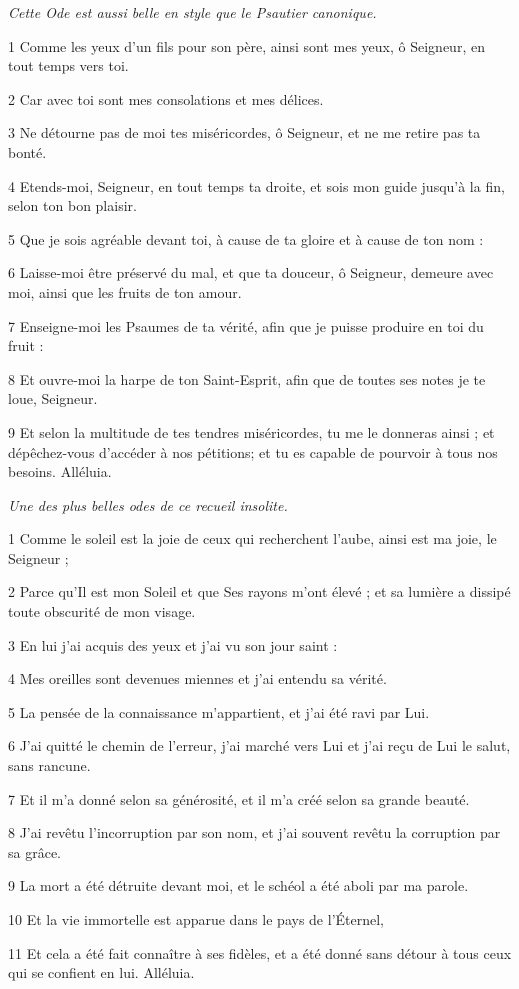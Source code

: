 
\par \textit{Cette Ode est aussi belle en style que le Psautier canonique.}

\par 1 Comme les yeux d'un fils pour son père, ainsi sont mes yeux, ô Seigneur, en tout temps vers toi.
\par 2 Car avec toi sont mes consolations et mes délices.
\par 3 Ne détourne pas de moi tes miséricordes, ô Seigneur, et ne me retire pas ta bonté.
\par 4 Etends-moi, Seigneur, en tout temps ta droite, et sois mon guide jusqu'à la fin, selon ton bon plaisir.
\par 5 Que je sois agréable devant toi, à cause de ta gloire et à cause de ton nom :
\par 6 Laisse-moi être préservé du mal, et que ta douceur, ô Seigneur, demeure avec moi, ainsi que les fruits de ton amour.
\par 7 Enseigne-moi les Psaumes de ta vérité, afin que je puisse produire en toi du fruit :
\par 8 Et ouvre-moi la harpe de ton Saint-Esprit, afin que de toutes ses notes je te loue, Seigneur.
\par 9 Et selon la multitude de tes tendres miséricordes, tu me le donneras ainsi ; et dépêchez-vous d'accéder à nos pétitions; et tu es capable de pourvoir à tous nos besoins. Alléluia.




\par \textit{Une des plus belles odes de ce recueil insolite.}

\par 1 Comme le soleil est la joie de ceux qui recherchent l'aube, ainsi est ma joie, le Seigneur ;
\par 2 Parce qu'Il est mon Soleil et que Ses rayons m'ont élevé ; et sa lumière a dissipé toute obscurité de mon visage.
\par 3 En lui j'ai acquis des yeux et j'ai vu son jour saint :
\par 4 Mes oreilles sont devenues miennes et j'ai entendu sa vérité.
\par 5 La pensée de la connaissance m'appartient, et j'ai été ravi par Lui.
\par 6 J'ai quitté le chemin de l'erreur, j'ai marché vers Lui et j'ai reçu de Lui le salut, sans rancune.
\par 7 Et il m'a donné selon sa générosité, et il m'a créé selon sa grande beauté.
\par 8 J'ai revêtu l'incorruption par son nom, et j'ai souvent revêtu la corruption par sa grâce.
\par 9 La mort a été détruite devant moi, et le schéol a été aboli par ma parole.
\par 10 Et la vie immortelle est apparue dans le pays de l'Éternel,
\par 11 Et cela a été fait connaître à ses fidèles, et a été donné sans détour à tous ceux qui se confient en lui. Alléluia.

